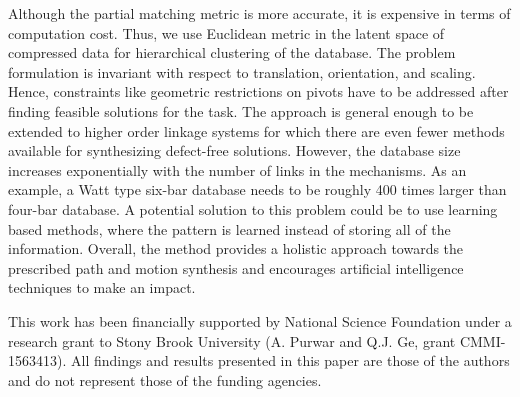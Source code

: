 \documentclass[twocolumn,10pt]{asme2ej}
\begin{document}
Although the partial matching metric is more accurate, it is expensive in terms of computation cost.
Thus, we use Euclidean metric in the latent space of compressed data for hierarchical clustering of the database.
The problem formulation is invariant with respect to translation, orientation, and scaling.
Hence, constraints like geometric restrictions on pivots have to be addressed after finding feasible solutions for the task.
The approach is general enough to be extended to higher order linkage systems for which there are even fewer methods available for synthesizing defect-free solutions.
However, the database size increases exponentially with the number of links in the mechanisms.
As an example, a Watt type six-bar database needs to be roughly 400 times larger than four-bar database.
A potential solution to this problem could be to use learning based methods, where the pattern is learned instead of storing all of the information.
Overall, the method provides a holistic approach towards the prescribed path and motion synthesis and encourages artificial intelligence techniques to make an impact.


\begin{acknowledgment}
This work has been financially supported by National Science Foundation under a research grant to Stony Brook University (A. Purwar and Q.J. Ge, grant CMMI-1563413). All findings and results presented in this paper are those of the authors and do not represent those of the funding agencies.
\end{acknowledgment}



\newpage
\clearpage
\listoftables
\listoffigures
\end{document}
